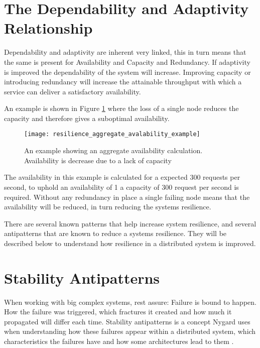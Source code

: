 \section{The Dependability and Adaptivity Relationship}
Dependability and adaptivity are inherent very linked, this in turn means that the same is present for Availability and Capacity and Redundancy. If adaptivity is improved the dependability of the system will increase. Improving capacity or introducing redundancy will increase the attainable throughput with which a service can deliver a satisfactory availability.

An example is shown in Figure \ref{fig:resilience_aggregate_avalability_example} where the loss of a single node reduces the capacity and therefore gives a suboptimal availability.

\begin{figure}[!htb]
  \texttt{[image: resilience\_aggregate\_avalability\_example]}  
  \caption{An example showing an aggregate  availability calculation. Availability is decrease due to a lack of capacity}
  \label{fig:resilience_aggregate_avalability_example}
\end{figure}

The availability in this example is calculated for a expected 300 requests per second, to uphold an availability of 1 a capacity of 300 request per second is required. Without any redundancy in place a single failing node means that the availability will be reduced, in turn reducing the systems resilience.

There are several known patterns that help increase system resilience, and several antipatterns that are known to reduce a systems resilience. They will be described below to understand how resilience in a distributed system is improved.

\section{Stability Antipatterns}
\label{sec:stability_antipatterns}
When working with big complex systems, rest assure: Failure is bound to happen. How the failure was triggered, which fractures it created and how much it propagated will differ each time. Stability antipatterns is a concept Nygard uses when understanding how these failures appear within a distributed system, which characteristics the failures have and how some architectures lead to them \cite[p. 31]{nygard2007release}.

